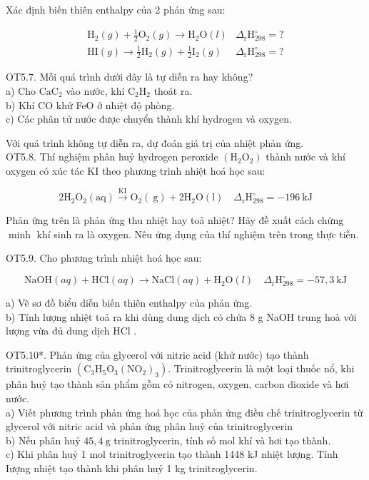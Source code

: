 \documentclass[10pt]{article}
\begin{document}
Xác định biến thiên enthalpy của 2 phản ứng sau:

$$
\begin{array}{ll}
\mathrm{H}_{2}(g)+\frac{1}{2} \mathrm{O}_{2}(g) \rightarrow \mathrm{H}_{2} \mathrm{O}(l) & \Delta_{\mathrm{r}} \mathrm{H}_{298}^{\circ}=? \\
\mathrm{HI}(g) \rightarrow \frac{1}{2} \mathrm{H}_{2}(g)+\frac{1}{2} \mathrm{I}_{2}(g) & \Delta_{\mathrm{r}} \mathrm{H}_{298}^{\circ}=?
\end{array}
$$

OT5.7. Mỗi quá trình dưới đây là tự diễn ra hay không?\\
a) Cho $\mathrm{CaC}_{2}$ vào nước, khí $\mathrm{C}_{2} \mathrm{H}_{2}$ thoát ra.\\
b) Khí CO khử FeO ở nhiệt độ phòng.\\
c) Các phân tử nước được chuyển thành khí hydrogen và oxygen.

Với quá trình không tự diễn ra, dự đoán giá trị của nhiệt phản ứng.\\
OT5.8. Thí nghiệm phân huỷ hydrogen peroxide $\left(\mathrm{H}_{2} \mathrm{O}_{2}\right)$ thành nước và khí oxygen có xúc tác KI theo phương trình nhiệt hoá học sau:

$$
2 \mathrm{H}_{2} \mathrm{O}_{2}(\mathrm{aq}) \xrightarrow{\mathrm{KI}} \mathrm{O}_{2}(\mathrm{~g})+2 \mathrm{H}_{2} \mathrm{O}(\mathrm{l}) \quad \Delta_{\mathrm{r}} \mathrm{H}_{298}^{\circ}=-196 \mathrm{~kJ}
$$

Phản ứng trên là phản ứng thu nhiệt hay toả nhiệt? Hãy đề xuất cách chứng $\operatorname{minh}$ khí sinh ra là oxygen. Nêu ứng dụng của thí nghiệm trên trong thực tiễn.

OT5.9. Cho phương trình nhiệt hoá học sau:

$$
\mathrm{NaOH}(a q)+\mathrm{HCl}(a q) \rightarrow \mathrm{NaCl}(a q)+\mathrm{H}_{2} \mathrm{O}(l) \quad \Delta_{\mathrm{r}} \mathrm{H}_{298}^{\circ}=-57,3 \mathrm{~kJ}
$$

a) Vẽ sơ đồ biểu diễn biến thiên enthalpy của phản ứng.\\
b) Tính lượng nhiệt toả ra khi dùng dung dịch có chứa 8 g NaOH trung hoà với lượng vừa đủ dung dịch HCl .

OT5.10*. Phản ứng của glycerol với nitric acid (khử nước) tạo thành trinitroglycerin $\left(\mathrm{C}_{3} \mathrm{H}_{5} \mathrm{O}_{3}\left(\mathrm{NO}_{2}\right)_{3}\right)$. Trinitroglycerin là một loại thuốc nổ, khi phân huỷ tạo thành sản phẩm gồm có nitrogen, oxygen, carbon dioxide và hơi nước.\\
a) Viết phương trình phản ứng hoá học của phản ứng điều chế trinitroglycerin từ glycerol với nitric acid và phản ứng phân huỷ của trinitroglycerin\\
b) Nếu phân huỷ $45,4 \mathrm{~g}$ trinitroglycerin, tính số mol khí và hơi tạo thành.\\
c) Khi phân huỷ 1 mol trinitroglycerin tạo thành 1448 kJ nhiệt lượng. Tính Iượng nhiệt tạo thành khi phân huỷ 1 kg trinitroglycerin.
\end{document}

